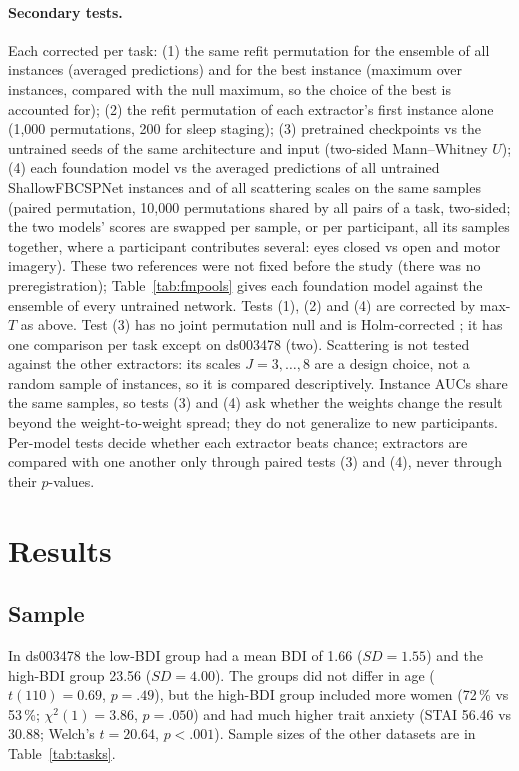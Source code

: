 \documentclass[11pt]{article}
\begin{document}
\paragraph{Secondary tests.} Each corrected per task: (1) the same refit permutation for the
ensemble of all instances (averaged predictions) and for the best instance (maximum over
instances, compared with the null maximum, so the choice of the best is accounted for);
(2) the refit permutation of each extractor's first instance alone (1,000 permutations, 200 for
sleep staging); (3) pretrained checkpoints vs the untrained seeds of the same architecture and
input (two-sided Mann--Whitney $U$); (4) each foundation model vs the averaged predictions of all
untrained ShallowFBCSPNet instances and of all scattering scales on the same samples (paired
permutation, 10,000 permutations shared by all pairs of a task, two-sided; the two models' scores
are swapped per sample, or per participant, all its samples together, where a participant
contributes several: eyes closed vs open and motor imagery). These two references were not fixed
before the study (there was no preregistration); Table~\ref{tab:fmpools} gives each foundation model
against the ensemble of every untrained network. Tests (1), (2) and (4) are corrected by max-$T$ as
above. Test (3) has no joint permutation null and is Holm-corrected \citep{holm1979}; it has one
comparison per task except on ds003478 (two). Scattering is not tested against the other
extractors: its scales $J = 3, \dots, 8$ are a design choice, not a random sample of instances, so
it is compared descriptively. Instance AUCs share the same samples, so tests (3) and (4) ask whether
the weights change the result beyond the weight-to-weight spread; they do not generalize to new
participants. Per-model tests decide whether each extractor beats chance; extractors are compared
with one another only through paired tests (3) and (4), never through their $p$-values.

\section{Results}

\subsection{Sample}
In ds003478 the low-BDI group had a mean BDI of 1.66 ($SD = 1.55$) and the high-BDI group 23.56
($SD = 4.00$). The groups did not differ in age ($t(110) = 0.69$, $p = .49$), but the high-BDI
group included more women (72\,\% vs 53\,\%; $\chi^2(1) = 3.86$, $p = .050$) and had much higher
trait anxiety (STAI 56.46 vs 30.88; Welch's $t = 20.64$, $p < .001$). Sample sizes of the other
datasets are in Table~\ref{tab:tasks}.
\end{document}

